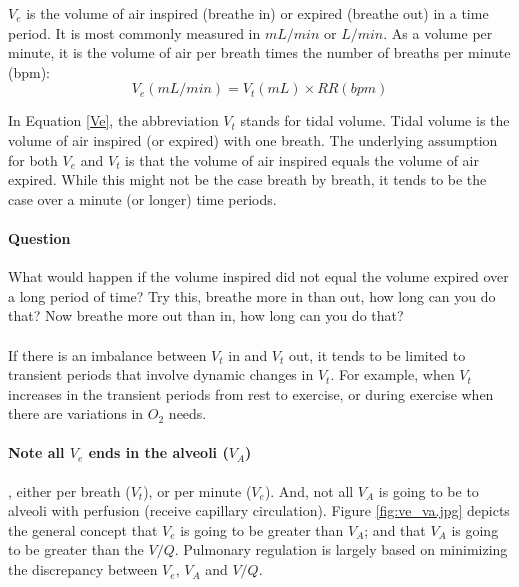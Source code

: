 $V_e$ is the volume of air inspired (breathe in) or expired (breathe out) in a time period. It is most commonly measured in $mL/min$ or $L/min$. As a volume per minute, it is the volume of air per breath times the number of breaths per minute (bpm):
\vspace{3mm}
\begin{equation}
    V_e (mL/min) = V_t (mL) \times RR (bpm)
    \label{Ve}
\end{equation}
\vspace{3mm}

In Equation \ref{Ve}, the abbreviation $V_t$ stands for tidal volume. Tidal volume is the volume of air inspired (or expired) with one breath. The underlying assumption for both $V_e$ and $V_t$ is that the volume of air inspired equals the volume of air expired. While this might not be the case breath by breath, it tends to be the case over a minute (or longer) time periods.

\paragraph{Question} What would happen if the volume inspired did not equal the volume expired over a long period of time? Try this, breathe more in than out, how long can you do that? Now breathe more out than in, how long can you do that?

\paragraph{} If there is an imbalance between $V_t$ in and $V_t$ out, it tends to be limited to transient periods that involve dynamic changes in $V_t$. For example, when $V_t$ increases in the transient periods from rest to exercise, or during exercise when there are variations in $O_2$ needs.

\paragraph{Note all $V_e$ ends in the alveoli ($V_A$)}, either per breath ($V_t$), or per minute ($V_e$). And, not all $V_A$ is going to be to alveoli with perfusion (receive capillary circulation). Figure \ref{fig:ve_va.jpg} depicts the general concept that $V_e$ is going to be greater than $V_A$; and that $V_A$ is going to be greater than the $V/Q$. Pulmonary regulation is largely based on minimizing the discrepancy between $V_e$, $V_A$ and $V/Q$.

